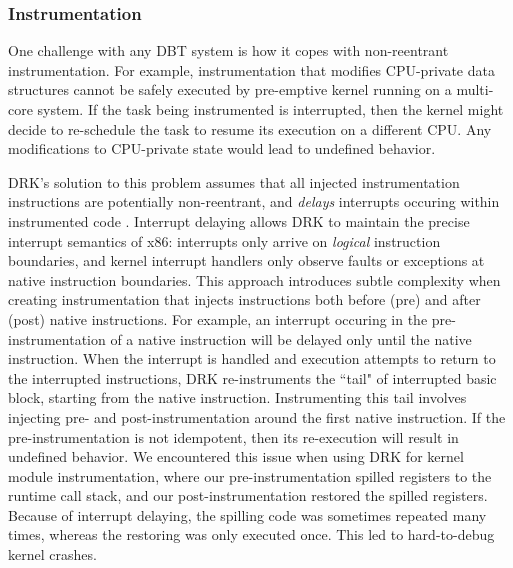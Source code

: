 \documentclass[preprint]{sigplanconf}
\begin{document}


\subsubsection{Instrumentation}

One challenge with any DBT system is how it copes with non-reentrant instrumentation. For example, instrumentation that modifies CPU-private data structures cannot be safely executed by pre-emptive kernel running on a multi-core system. If the task being instrumented is interrupted, then the kernel might decide to re-schedule the task to resume its execution on a different CPU. Any modifications to CPU-private state would lead to undefined behavior.

DRK's solution to this problem assumes that all injected instrumentation instructions are potentially non-reentrant, and \emph{delays} interrupts occuring within instrumented code \cite{DRK}. Interrupt delaying allows DRK to maintain the precise interrupt semantics of x86: interrupts only arrive on \emph{logical} instruction boundaries, and kernel interrupt handlers only observe faults or exceptions at native instruction boundaries. This approach introduces subtle complexity when creating instrumentation that injects instructions both before (pre) and after (post) native instructions. For example, an interrupt occuring in the pre-instrumentation of a native instruction will be delayed only until the native instruction. When the interrupt is handled and execution attempts to return to the interrupted instructions, DRK re-instruments the ``tail" of interrupted basic block, starting from the native instruction. Instrumenting this tail involves injecting pre- and post-instrumentation around the first native instruction. If the pre-instrumentation is not idempotent, then its re-execution will result in undefined behavior. We encountered this issue when using DRK for kernel module instrumentation, where our pre-instrumentation spilled registers to the runtime call stack, and our post-instrumentation restored the spilled registers. Because of interrupt delaying, the spilling code was sometimes repeated many times, whereas the restoring was only executed once. This led to hard-to-debug kernel crashes.
\end{document}
